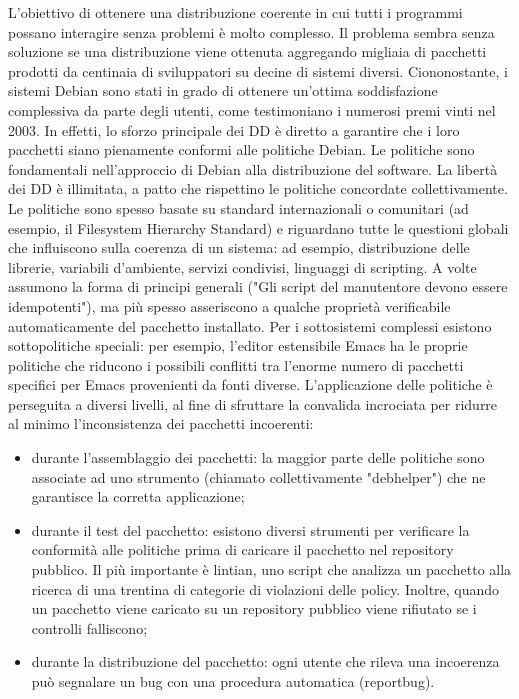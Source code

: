 \documentclass[a4paper,12pt,titlepage,oneside]{book}
\begin{document}
    L'obiettivo di ottenere una distribuzione coerente in cui tutti i programmi possano interagire senza problemi è molto complesso.
    Il problema sembra senza soluzione se una distribuzione viene ottenuta aggregando migliaia di pacchetti prodotti da centinaia di sviluppatori su decine di sistemi diversi. Ciononostante, 
    i sistemi Debian sono stati in grado di ottenere un'ottima soddisfazione complessiva da parte degli utenti, come testimoniano i numerosi premi vinti nel 2003. In effetti, lo sforzo principale dei
    DD è diretto a garantire che i loro pacchetti siano pienamente conformi alle politiche Debian. Le politiche sono fondamentali nell'approccio di Debian alla distribuzione del software.
    La libertà dei DD è illimitata, a patto che rispettino le politiche concordate collettivamente. Le politiche sono
    spesso basate su standard internazionali o comunitari (ad esempio, il Filesystem Hierarchy Standard) e riguardano tutte le questioni globali che influiscono sulla coerenza di un sistema: 
    ad esempio, distribuzione delle librerie, variabili d'ambiente, servizi condivisi, linguaggi di scripting. A volte assumono la forma di principi generali ("Gli script del manutentore
    devono essere idempotenti"), ma più spesso asseriscono a qualche proprietà verificabile automaticamente del pacchetto installato.
    Per i sottosistemi complessi esistono sottopolitiche speciali: per esempio, l'editor estensibile Emacs ha le proprie politiche che riducono i possibili conflitti tra l'enorme numero di pacchetti specifici
    per Emacs provenienti da fonti diverse. L'applicazione delle politiche è perseguita a diversi livelli, al fine di sfruttare la convalida incrociata per ridurre al minimo l'inconsistenza dei pacchetti incoerenti:
    \begin{itemize}
        \item durante l'assemblaggio dei pacchetti: la maggior parte delle politiche sono associate ad uno strumento (chiamato collettivamente "debhelper") che ne garantisce la corretta applicazione;
        \item durante il test del pacchetto: esistono diversi strumenti per verificare la conformità alle politiche prima di caricare il pacchetto nel repository pubblico. Il più importante è lintian, uno script che analizza 
        un pacchetto alla ricerca di una trentina di
            categorie di violazioni delle policy. Inoltre, quando un pacchetto viene caricato su un repository pubblico viene rifiutato se i controlli falliscono;
        \item durante la distribuzione del pacchetto: ogni utente che rileva una incoerenza può segnalare un bug con una procedura automatica (reportbug).
    \end{itemize}
   
\end{document}
